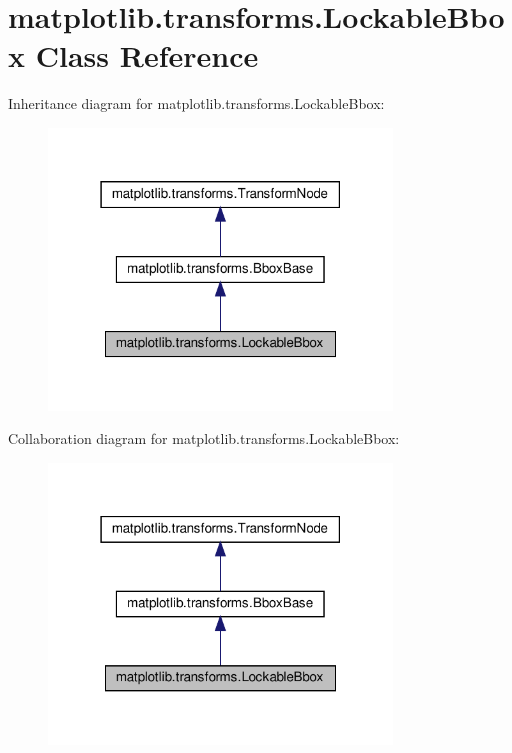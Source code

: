 \hypertarget{classmatplotlib_1_1transforms_1_1LockableBbox}{}\section{matplotlib.\+transforms.\+Lockable\+Bbox Class Reference}
\label{classmatplotlib_1_1transforms_1_1LockableBbox}


Inheritance diagram for matplotlib.\+transforms.\+Lockable\+Bbox\+:
\nopagebreak
\begin{figure}[H]
\begin{center}
\leavevmode
\includegraphics[width=259pt]{classmatplotlib_1_1transforms_1_1LockableBbox__inherit__graph}
\end{center}
\end{figure}


Collaboration diagram for matplotlib.\+transforms.\+Lockable\+Bbox\+:
\nopagebreak
\begin{figure}[H]
\begin{center}
\leavevmode
\includegraphics[width=259pt]{classmatplotlib_1_1transforms_1_1LockableBbox__coll__graph}
\end{center}
\end{figure}
